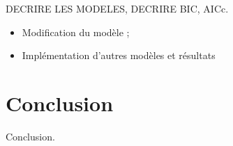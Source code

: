 \documentclass[a4paper, 12pt, svgnames]{article}
\begin{document}
DECRIRE LES MODELES, DECRIRE BIC, AICc.

\begin{itemize}
    \item Modification du modèle ;
    \item Implémentation d'autres modèles et résultats
\end{itemize}


\section{Conclusion}
Conclusion.

%


\end{document}
